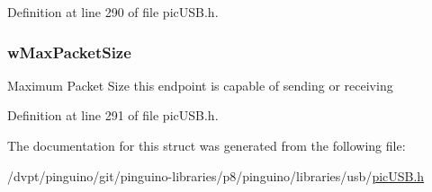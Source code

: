Definition at line 290 of file pic\-U\-S\-B.\-h.

\hypertarget{struct_u_s_b___endpoint___descriptor_a6b9f4ee406e56ca4242b5c7502060842}{
\subsubsection[{w\-Max\-Packet\-Size}]{ w\-Max\-Packet\-Size}}\label{struct_u_s_b___endpoint___descriptor_a6b9f4ee406e56ca4242b5c7502060842}
Maximum Packet Size this endpoint is capable of sending or receiving 

Definition at line 291 of file pic\-U\-S\-B.\-h.



The documentation for this struct was generated from the following file\-:\begin{DoxyCompactItemize}
\item 
/dvpt/pinguino/git/pinguino-\/libraries/p8/pinguino/libraries/usb/\hyperlink{pic_u_s_b_8h}{pic\-U\-S\-B.\-h}\end{DoxyCompactItemize}
